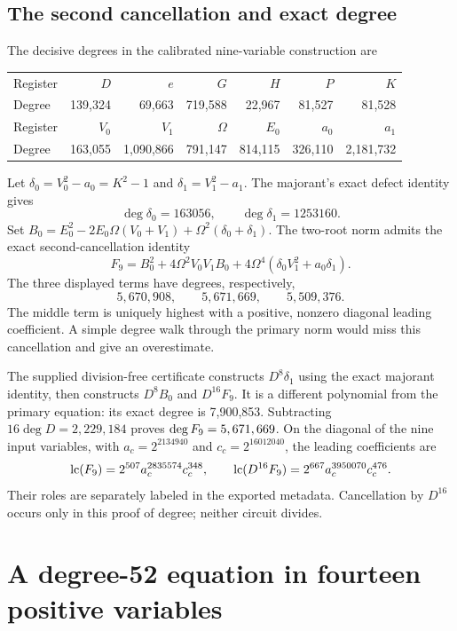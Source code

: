 \documentclass[11pt,a4paper]{article}
\theoremstyle{definition}\newtheorem{definition}[theorem]{Definition}
\theoremstyle{remark}\newtheorem{remark}[theorem]{Remark}
\begin{document}
\subsection{The second cancellation and exact degree}

The decisive degrees in the calibrated nine-variable construction are
\begin{center}\small
\begin{tabular}{@{}lrrrrrr@{}}
\toprule
Register &$D$&$e$&$G$&$H$&$P$&$K$\\
Degree &139,324&69,663&719,588&22,967&81,527&81,528\\
\midrule
Register &$V_0$&$V_1$&$\Omega$&$E_0$&$a_0$&$a_1$\\
Degree &163,055&1,090,866&791,147&814,115&326,110&2,181,732\\
\bottomrule
\end{tabular}
\end{center}
Let $\delta_0=V_0^2-a_0=K^2-1$ and
$\delta_1=V_1^2-a_1$. The majorant's exact defect identity gives
\[
 \deg\delta_0=163056,\qquad\deg\delta_1=1253160.
\]
Set $B_0=E_0^2-2E_0\Omega(V_0+V_1)+\Omega^2(\delta_0+\delta_1)$.
The two-root norm admits the exact second-cancellation identity
\begin{equation}\label{eq:second-cancel}
 F_9=B_0^2+4\Omega^2V_0V_1B_0
       +4\Omega^4(\delta_0V_1^2+a_0\delta_1).
\end{equation}
The three displayed terms have degrees, respectively,
\[
 5,670,908,\qquad5,671,669,\qquad5,509,376.
\]
The middle term is uniquely highest with a positive, nonzero diagonal
leading coefficient. A simple degree walk through the primary norm would
miss this cancellation and give an overestimate.

The supplied division-free certificate constructs $D^8\delta_1$ using
the exact majorant identity, then constructs $D^8B_0$ and $D^{16}F_9$.
It is a different polynomial from the primary equation: its exact degree
is 7,900,853. Subtracting $16\deg D=2,229,184$ proves
$\deg F_9=5,671,669$. On the diagonal of the nine input variables,
with $a_c=2^{2134940}$ and $c_c=2^{16012040}$, the leading coefficients are
\[
 \operatorname{lc}(F_9)=2^{507}a_c^{2835574}c_c^{348},\qquad
 \operatorname{lc}(D^{16}F_9)=2^{667}a_c^{3950070}c_c^{476}.
\]
Their roles are separately labeled in the exported metadata. Cancellation
by $D^{16}$ occurs only in this proof of degree; neither circuit divides.

\section{A degree-52 equation in fourteen positive variables}\label{sec:fourteen}
\end{document}
